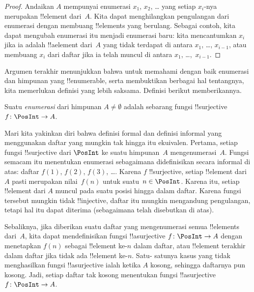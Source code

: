 \documentclass[../../../include/open-logic-section]{subfiles}
\begin{document}
\begin{proof}
  Andaikan $A$ mempunyai enumerasi $x_1$, $x_2$, \dots{} yang setiap $x_i$-nya
  merupakan !!{element} dari~$A$. Kita dapat menghilangkan pengulangan dari
  enumerasi dengan membuang !!{element}s yang berulang. Sebagai contoh, kita
  dapat mengubah enumerasi itu menjadi enumerasi baru: kita mencantumkan $x_i$
  jika ia adalah !!a{element} dari~$A$ yang tidak terdapat di antara $x_1$,
  \dots, $x_{i-1}$, atau membuang $x_i$ dari daftar jika ia telah muncul di
  antara $x_1$, \dots,~$x_{i-1}$.
\end{proof}

Argumen terakhir menunjukkan bahwa untuk memahami dengan baik enumerasi dan
himpunan yang !!{enumerable}, serta membuktikan berbagai hal tentangnya, kita
memerlukan definisi yang lebih saksama. Definisi berikut memberikannya.

\begin{defn}
Suatu \emph{enumerasi} dari himpunan $A \neq \emptyset$ adalah sebarang
fungsi !!{surjective} $f \colon \PosInt \to A$.
\end{defn}

\begin{explain}
Mari kita yakinkan diri bahwa definisi formal dan definisi informal yang
menggunakan daftar yang mungkin tak hingga itu ekuivalen. Pertama, setiap
fungsi !!{surjective} dari $\PosInt$ ke suatu himpunan~$A$ mengenumerasi~$A$.
Fungsi semacam itu menentukan enumerasi sebagaimana didefinisikan secara
informal di atas: daftar $f(1)$, $f(2)$, $f(3)$, \dots. Karena $f$
!!{surjective}, setiap !!{element} dari~$A$ pasti merupakan nilai~$f(n)$ untuk
suatu~$n \in \PosInt$. Karena itu, setiap !!{element} dari $A$ muncul pada
suatu posisi hingga dalam daftar. Karena fungsi tersebut mungkin tidak
!!{injective}, daftar itu mungkin mengandung pengulangan, tetapi hal itu dapat
diterima (sebagaimana telah disebutkan di atas).

Sebaliknya, jika diberikan suatu daftar yang mengenumerasi semua !!{element}s
dari~$A$, kita dapat mendefinisikan fungsi !!a{surjective} $f\colon \PosInt
\to A$ dengan menetapkan $f(n)$ sebagai !!{element} ke-$n$ dalam daftar, atau
!!{element} terakhir dalam daftar jika tidak ada !!{element} ke-$n$. Satu-
satunya kasus yang tidak menghasilkan fungsi !!a{surjective} ialah ketika $A$
kosong, sehingga daftarnya pun kosong. Jadi, setiap daftar tak kosong
menentukan fungsi !!a{surjective} $f\colon \PosInt \to A$.
\end{explain}
\end{document}
